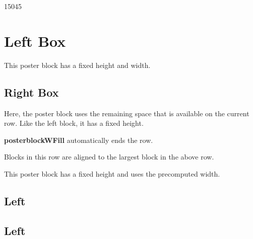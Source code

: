 \documentclass[a4paper, 11pt]{article}
\let \oldsection \section
\renewcommand{\section}{\vspace{-10pt}\oldsection}
\begin{document}
\begin{poster}
\begin{postercolumns}[2]
    \end{postercolumns}

    \begin{posterrows}[3]

        \begin{posterblockW}{150}{45}
            \section{Left Box}
            This poster block has a fixed height and width.
        \end{posterblockW}

        \begin{posterblockWFill}{25}
            \section{Right Box}
            Here, the poster block uses the remaining space that is available on the current row.
            Like the left block, it has a fixed height.
        \end{posterblockWFill}

        \begin{posterblock}
            {\bf posterblockWFill} automatically ends the row.
        \end{posterblock}

        \begin{posterblock}
            Blocks in this row are aligned to the largest block in the above row.
        \end{posterblock}

        \begin{posterblockH}{30}
            This poster block has a fixed height and uses the precomputed width.
        \end{posterblockH}

    \end{posterrows}

    \begin{postercolumns}[5]
        \begin{posterblock}
            \section{Left}
        \end{posterblock}
        \begin{posterblock}
            \section{Left}
        \end{posterblock}
        \begin{posterblock}

\end{posterblock}
\end{postercolumns}
\end{poster}
\end{document}
